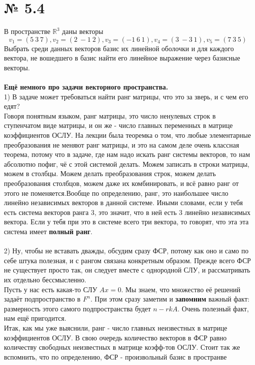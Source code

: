\documentclass[a4paper,11pt]{report}
\begin{document}
\section{№ 5.4}
В пространстве $\mathbb{R}^3$ даны векторы
\[
v_1 = (5\ 3\ 7), v_2 = (2\ -1\ 2), v_3 = (-1\ 6\ 1), v_4 = (3\ -3\ 1), v_5 = (7\ 3\ 5)
\]
Выбрать среди данных векторов базис их линейной оболочки и для каждого вектора, не вошедшего в базис найти его
линейное выражение через базисные векторы.
\\
\\
\textbf{Ещё немного про задачи векторного пространства.}\\
1) В задаче может требоваться найти ранг матрицы, что это за зверь, и с чем его едят?\\
Говоря понятным языком, ранг матрицы, это число ненулевых строк в ступенчатом виде матрицы, и он же - число главных переменных
в матрице коэффициентов ОСЛУ. На лекции была теоремка о том, что любые элементарные преобразования не меняют ранг матрицы,
и это на самом деле очень классная теорема, потому что в задаче, где нам надо искать ранг системы векторов, то нам абсолютно пофиг,
чё с этой системой делать. Можем записать в строки матрицы, можем в столбцы. Можем делать преобразования строк, можем делать
преобразования столбцов, можем даже их комбинировать, и всё равно ранг от этого не поменяется.Вообще по определению, ранг, это наибольшее
число линейно независимых векторов в данной системе. Иными словами, если у тебя есть система векторов ранга 3, это значит, что в ней есть 3 линейно
независимых вектора. Если у тебя при это в системе всего три вектора, то говорят, что эта эта система имеет \textbf{полный ранг}.\\
\\
2) Ну, чтобы не вставать дважды, обсудим сразу ФСР, потому как оно и само по себе штука полезная, и с рангом связана конкретным образом.
Прежде всего ФСР не существует просто так, он следует вместе с однородной СЛУ, и рассматривать их отдельно бессмысленно.\\
Пусть у нас есть какая-то СЛУ $Ax = 0$. Мы знаем, что множество её решений задаёт подпространство в $F^n$. При этом
сразу заметим и \textbf{запомним} важный факт: размерность этого самого подпространства будет $n - rkA$. Очень полезный факт, нам ещё пригодится.\\
Итак, как мы уже выяснили, ранг - число главных неизвестных в матрице коэффициентов ОСЛУ. В свою очередь количество векторов в ФСР равно
количеству свободных неизвестных в матрице коэфф-тов ОСЛУ. Стоит так же вспомнить, что по определению, ФСР - произвольный базис в пространве
\end{document}

